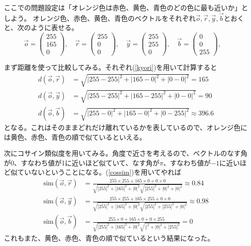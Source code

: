 \documentclass[10pt]{jsarticle}
\theoremstyle{definition}%
\numberwithin{equation}{section}%
\begin{document}
ここでの問題設定は「オレンジ色は赤色、黄色、青色のどの色に最も近いか」としよう。
オレンジ色、赤色、黄色、青色のベクトルをそれぞれ$\vec{o},\vec{r},\vec{y},\vec{b}$とおくと、次のように表せる。
\begin{equation}
  \vec{o}=\left( \begin{matrix}
    255\\
    165\\
    0
  \end{matrix}\right),\quad 
  \vec{r}=\left( \begin{matrix}
    255\\
    0\\
    0
  \end{matrix}\right),\quad 
  \vec{y}=\left( \begin{matrix}
    255\\
    255\\
    0
  \end{matrix}\right),\quad 
  \vec{b}=\left( \begin{matrix}
    0\\
    0\\
    255
  \end{matrix}\right),\quad 
\end{equation}


まず距離を使って比較してみる。それぞれ(\ref{kyori})を用いて計算すると
\begin{align}
  d(\vec{o},\vec{r})&=\sqrt{|255-255|^{2}+|165-0|^{2}+|0-0|^{2}}=165\\
  d(\vec{o},\vec{y})&=\sqrt{|255-255|^{2}+|165-255|^{2}+|0-0|^{2}}=90\\
  d(\vec{o},\vec{b})&=\sqrt{|255-0|^{2}+|165-0|^{2}+|0-255|^{2}}\approx 396.6
\end{align}
となる。これはそのままどれだけ離れているかを表しているので、オレンジ色には黄色、赤色、青色の順で似ているといえる。


次にコサイン類似度を用いてみる。角度で近さを考えるので、ベクトルのなす角が0、すなわち値が1に近いほど似ていて、なす角が$\pi$、すなわち値が$-1$に近いほど似ていないということになる。(\ref{cossim})を用いてやれば
\begin{align}
  \mathrm{sim}(\vec{o},\vec{r})&=\frac{255\times 255 +165\times 0 +0\times0}{\sqrt{|255|^{2}+|165|^{2}+|0|^2}\sqrt{|255|^{2}+|0|^{2}+|0|^2}}\approx 0.84\\
  \mathrm{sim}(\vec{o},\vec{y})&=\frac{255\times 255 +165\times 255 +0\times0}{\sqrt{|255|^{2}+|165|^{2}+|0|^2}\sqrt{|255|^{2}+|255|^{2}+|0|^2}}\approx 0.98\\
  \mathrm{sim}(\vec{o},\vec{b})&=\frac{255\times 0 +165\times 0 +0\times255}{\sqrt{|255|^{2}+|165|^{2}+|0|^2}\sqrt{||^{2}+|0|^{2}+|255|^2}}= 0
\end{align}
これもまた、黄色、赤色、青色の順で似ているという結果になった。
\end{document}
